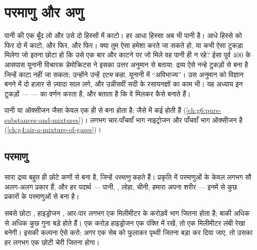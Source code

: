 \chapter{परमाणु और अणु}\label{ch:g7:atoms-and-molecules}

पानी की एक बूँद लो और उसे दो हिस्सों में काटो। हर आधा हिस्सा अब भी पानी है।
आधे हिस्से को फिर दो में काटो, और फिर, और फिर। क्या तुम ऐसा हमेशा करते जा
सकते हो, या कभी ऐसा टुकड़ा मिलेगा जो इतना छोटा हो कि उसे एक बार और काटने पर
जो मिले वह पानी ही न रहे? ईसा पूर्व 400 के आसपास यूनानी
विचारक डेमोक्रिटस ने इसका उत्तर अनुमान से बताया: द्रव्य ऐसे नन्हे टुकड़ों से
बना है जिन्हें काटा नहीं जा सकता; उन्होंने उन्हें \emph{एटम} कहा, यूनानी में
``अविभाज्य''। उस अनुमान को विज्ञान बनने में दो हज़ार से ज़्यादा साल लगे, और
उन्नीसवीं सदी के रसायनज्ञों का काम भी। यह अध्याय इन टुकड़ों ---
 --- का वर्णन करता है, और बताता है कि वे मिलकर
 कैसे बनाते हैं।

\begin{recall}
पानी या ऑक्सीजन जैसा  केवल एक ही  से बना होता
है;  जैसे  में कई होती हैं
(\cref{ch:g6:pure-substances-and-mixtures})।  लगभग चार-पाँचवाँ भाग
नाइट्रोजन और पाँचवाँ भाग ऑक्सीजन है (\cref{ch:g4:air-a-mixture-of-gases})।
\end{recall}

\section{परमाणु}

\begin{definition}[परमाणु]\label{def:g7:atoms-and-molecules:atom}
सारा द्रव्य बहुत ही छोटे कणों से बना है, जिन्हें
\emph{परमाणु} कहते हैं। प्रकृति में परमाणुओं के केवल लगभग सौ
अलग-अलग प्रकार हैं, और हर पदार्थ --- पानी, , लोहा,
चीनी, हमारा अपना शरीर --- इनमें से कुछ प्रकारों के परमाणुओं से बना है।
\end{definition}

\begin{proposition}[परमाणु बहुत छोटे होते हैं]\label{prop:g7:atoms-and-molecules:tiny}
सबसे छोटा , हाइड्रोजन , आर-पार लगभग एक मिलीमीटर के करोड़वें भाग
जितना होता है; बाकी अधिक से अधिक कुछ गुना बड़े होते हैं। एक करोड़
हाइड्रोजन  एक पंक्ति में रखें, तो एक मिलीमीटर लंबी रेखा बनेगी।
इसकी कल्पना ऐसे करो: अगर एक सेब को फुलाकर पृथ्वी जितना बड़ा कर दिया जाए, तो
उसका हर  लगभग एक छोटी चेरी जितना होगा।
\end{proposition}

